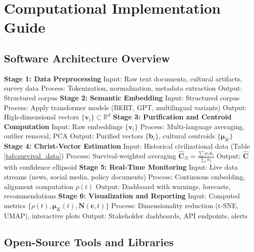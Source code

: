 \documentclass[11pt,a4paper]{article}
\theoremstyle{definition}
\theoremstyle{remark}
\newcommand{\RR}{\mathbb{R}}
\newcommand{\bb}{\mathbf{b}}
\newcommand{\cc}{\mathbf{c}}
\begin{document}
\section{Computational Implementation Guide}

\subsection{Software Architecture Overview}

\begin{algorithm}[H]
\caption{End-to-End Divine Mathematics Pipeline}
\begin{algorithmic}[1]
\State \textbf{Stage 1: Data Preprocessing}
\State \quad Input: Raw text documents, cultural artifacts, survey data
\State \quad Process: Tokenization, normalization, metadata extraction
\State \quad Output: Structured corpus
\State 
\State \textbf{Stage 2: Semantic Embedding}
\State \quad Input: Structured corpus
\State \quad Process: Apply transformer models (BERT, GPT, multilingual variants)
\State \quad Output: High-dimensional vectors \(\{\mathbf{v}_i\} \subset \RR^d\)
\State 
\State \textbf{Stage 3: Purification and Centroid Computation}
\State \quad Input: Raw embeddings \(\{\mathbf{v}_i\}\)
\State \quad Process: Multi-language averaging, outlier removal, PCA
\State \quad Output: Purified vectors \(\{\bb_i\}\), cultural centroids \(\{\boldsymbol{\mu}_K\}\)
\State 
\State \textbf{Stage 4: Christ-Vector Estimation}
\State \quad Input: Historical civilizational data (Table \ref{tab:survival_data})
\State \quad Process: Survival-weighted averaging \(\hat{\mathbf{C}}_N = \frac{\sum w_i \bar{\mathbf{v}}_i}{\sum w_i}\)
\State \quad Output: \(\hat{\mathbf{C}}\) with confidence ellipsoid
\State 
\State \textbf{Stage 5: Real-Time Monitoring}
\State \quad Input: Live data streams (news, social media, policy documents)
\State \quad Process: Continuous embedding, alignment computation \(\rho(t)\)
\State \quad Output: Dashboard with warnings, forecasts, recommendations
\State 
\State \textbf{Stage 6: Visualization and Reporting}
\State \quad Input: Computed metrics \(\{\rho(t), \boldsymbol{\mu}_K(t), \mathbf{N}(\cc,t)\}\)
\State \quad Process: Dimensionality reduction (t-SNE, UMAP), interactive plots
\State \quad Output: Stakeholder dashboards, API endpoints, alerts
\end{algorithmic}
\end{algorithm}

\subsection{Open-Source Tools and Libraries}
\end{document}
